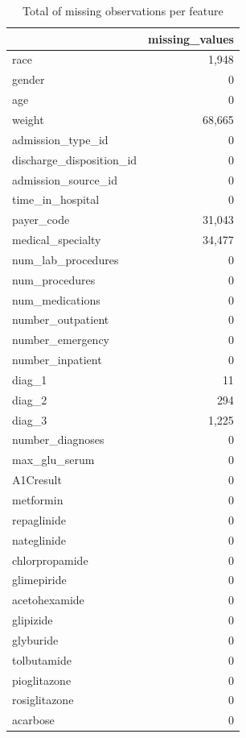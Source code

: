 \documentclass[
]{article}
\begin{document}
\begin{table}[H]

\caption{\label{tab:unnamed-chunk-7}Total of missing observations per feature}
\centering
\begin{tabular}[t]{l|r}
\hline
  & missing\_values\\
\hline
race & 1,948\\
\hline
gender & 0\\
\hline
age & 0\\
\hline
weight & 68,665\\
\hline
admission\_type\_id & 0\\
\hline
discharge\_disposition\_id & 0\\
\hline
admission\_source\_id & 0\\
\hline
time\_in\_hospital & 0\\
\hline
payer\_code & 31,043\\
\hline
medical\_specialty & 34,477\\
\hline
num\_lab\_procedures & 0\\
\hline
num\_procedures & 0\\
\hline
num\_medications & 0\\
\hline
number\_outpatient & 0\\
\hline
number\_emergency & 0\\
\hline
number\_inpatient & 0\\
\hline
diag\_1 & 11\\
\hline
diag\_2 & 294\\
\hline
diag\_3 & 1,225\\
\hline
number\_diagnoses & 0\\
\hline
max\_glu\_serum & 0\\
\hline
A1Cresult & 0\\
\hline
metformin & 0\\
\hline
repaglinide & 0\\
\hline
nateglinide & 0\\
\hline
chlorpropamide & 0\\
\hline
glimepiride & 0\\
\hline
acetohexamide & 0\\
\hline
glipizide & 0\\
\hline
glyburide & 0\\
\hline
tolbutamide & 0\\
\hline
pioglitazone & 0\\
\hline
rosiglitazone & 0\\
\hline
acarbose & 0\\

\end{tabular}
\end{table}
\end{document}
